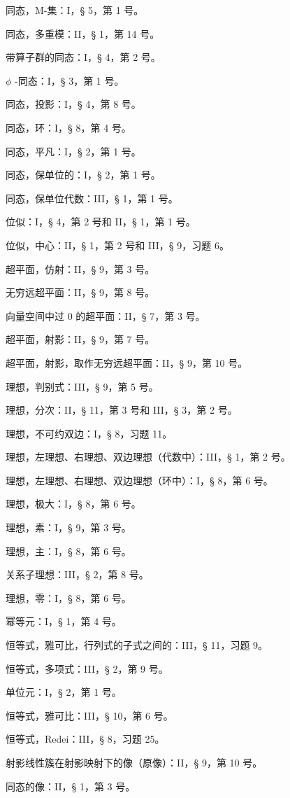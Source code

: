 同态，M-集：I，§ 5，第 1 号。

同态，多重模：II，§ 1，第 14 号。

带算子群的同态：I，§ 4，第 2 号。

\(\phi\) -同态：I，§ 3，第 1 号。

同态，投影：I，§ 4，第 8 号。

同态，环：I，§ 8，第 4 号。

同态，平凡：I，§ 2，第 1 号。

同态，保单位的：I，§ 2，第 1 号。

同态，保单位代数：III，§ 1，第 1 号。

位似：I，§ 4，第 2 号和 II，§ 1，第 1 号。

位似，中心：II，§ 1，第 2 号和 III，§ 9，习题 6。

超平面，仿射：II，§ 9，第 3 号。

无穷远超平面：II，§ 9，第 8 号。

向量空间中过 0 的超平面：II，§ 7，第 3 号。

超平面，射影：II，§ 9，第 7 号。

超平面，射影，取作无穷远超平面：II，§ 9，第 10 号。

理想，判别式：III，§ 9，第 5 号。

理想，分次：II，§ 11，第 3 号和 III，§ 3，第 2 号。

理想，不可约双边：I，§ 8，习题 11。

理想，左理想、右理想、双边理想（代数中）：III，§ 1，第 2 号。

理想，左理想、右理想、双边理想（环中）：I，§ 8，第 6 号。

理想，极大：I，§ 8，第 6 号。

理想，素：I，§ 9，第 3 号。

理想，主：I，§ 8，第 6 号。

关系子理想：III，§ 2，第 8 号。

理想，零：I，§ 8，第 6 号。

幂等元：I，§ 1，第 4 号。

恒等式，雅可比，行列式的子式之间的：III，§ 11，习题 9。

恒等式，多项式：III，§ 2，第 9 号。

单位元：I，§ 2，第 1 号。

恒等式，雅可比：III，§ 10，第 6 号。

恒等式，Redei：III，§ 8，习题 25。

射影线性簇在射影映射下的像（原像）：II，§ 9，第 10 号。

同态的像：II，§ 1，第 3 号。

